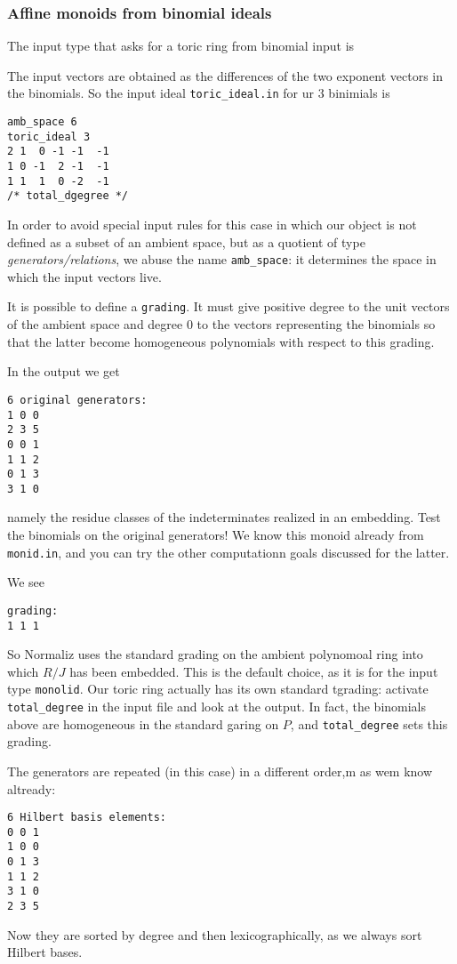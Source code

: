 \subsubsection{Affine monoids from binomial ideals}\label{toric_ideal}
The input type that asks for a toric ring from binomial input is
\begin{itemize}
\end{itemize}
The input vectors are obtained as the differences of the two exponent vectors in the binomials. So the input ideal \verb+toric_ideal.in+ for ur $3$ binimials is
\begin{Verbatim}
amb_space 6
toric_ideal 3
2 1  0 -1 -1  -1
1 0 -1  2 -1  -1
1 1  1  0 -2  -1
/* total_dgegree */
\end{Verbatim}
In order to avoid special input rules for this case in which our object is not defined as a subset of an ambient space, but as a quotient of type \emph{generators/relations}, we abuse the name \verb|amb_space|: it determines the space in which the input vectors live.

It is possible to define a \verb|grading|. It must give positive degree to the unit vectors of the ambient space and degree $0$ to the vectors representing the binomials so that the latter become homogeneous polynomials with respect to this grading.

In the output we get
\begin{Verbatim}
6 original generators:
1 0 0
2 3 5
0 0 1
1 1 2
0 1 3
3 1 0
\end{Verbatim}
namely the residue classes of the indeterminates realized in an embedding. Test the binomials on the original generators! We know this monoid already from \verb|monid.in|, and you can try the other computationn goals discussed for the latter.

We see
\begin{Verbatim}
grading:
1 1 1 
\end{Verbatim}
So Normaliz uses the standard grading on the ambient polynomoal ring into which $R/J$ has been embedded. This is the default choice, as it is for the input type \verb|monolid|. Our toric ring actually has its own standard tgrading: activate \verb|total_degree| in the input file and look at the output. In fact, the binomials above are homogeneous in the standard garing on $P$, and \verb|total_degree| sets this grading.

The generators are repeated (in this case) in a different order,m as wem know altready:
\begin{Verbatim}
6 Hilbert basis elements:
0 0 1
1 0 0
0 1 3
1 1 2
3 1 0
2 3 5
\end{Verbatim}
Now they are sorted by degree and then lexicographically, as we always sort Hilbert bases.

